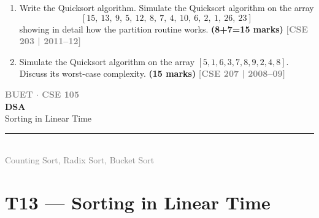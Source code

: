\documentclass[12pt,a3paper]{article}
\newcommand{\yr}[1]{\hfill\textcolor{gray}{\small\textbf{[#1]}}}
\newcommand{\mk}[1]{\textcolor{orange!70!black}{\small\textbf{(#1 marks)}}}
\newcommand{\secdivider}[4]{%
  \newpage\thispagestyle{empty}%
  \vspace*{\fill}%
  \begin{tcolorbox}[enhanced,colback=#4!7,colframe=#3,boxrule=1.5pt,arc=8pt,
    left=20pt,right=20pt,top=22pt,bottom=22pt,
    shadow={3pt}{-3pt}{0pt}{black!15}]
    \centering
    {\large\textcolor{gray}{\textbf{BUET $\cdot$ CSE 105}}}\\[8pt]
    {\fontsize{26}{32}\selectfont\bfseries\textcolor{#3}{DSA}}\\[6pt]
    {\fontsize{15}{19}\selectfont\textcolor{dgray}{#1}}\\[12pt]
    \textcolor{#3!60}{\rule{0.5\textwidth}{0.5pt}}\\[6pt]
    {\small\textcolor{gray}{#2}}
  \end{tcolorbox}%
  \vspace*{\fill}\newpage%
}
\begin{document}
\begin{enumerate}
\item Write the Quicksort algorithm. Simulate the Quicksort algorithm on the array
\[ [15,\ 13,\ 9,\ 5,\ 12,\ 8,\ 7,\ 4,\ 10,\ 6,\ 2,\ 1,\ 26,\ 23] \]
showing in detail how the partition routine works. \mk{8+7=15}
\yr{CSE 203 | 2011--12}

\item Simulate the Quicksort algorithm on the array $[5, 1, 6, 3, 7, 8, 9, 2, 4, 8]$. Discuss its worst-case complexity. \mk{15}
\yr{CSE 207 | 2008--09}

\end{enumerate}
\newpage

\secdivider{Sorting in Linear Time}{Counting Sort, Radix Sort, Bucket Sort}{cF}{cF}
\label{sec:T13}
\section{T13 --- Sorting in Linear Time}
\end{document}
